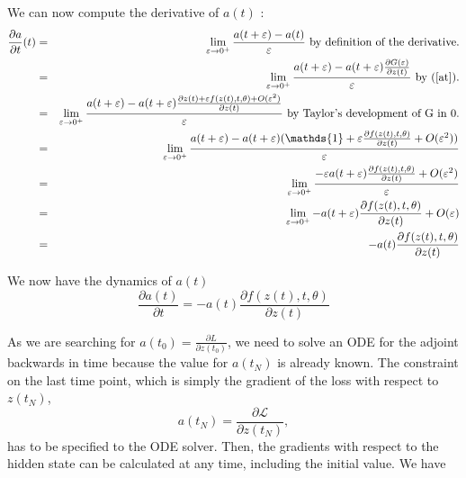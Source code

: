 \documentclass[10pt,a4paper]{article}
\theoremstyle{definition}
\theoremstyle{definition}
\theoremstyle{definition}
\begin{document}
We can now compute the derivative of $a(t)$ :
\begin{eqnarray*}
\frac{\partial a}{\partial t}(t) &=& \lim_{\varepsilon \rightarrow 0^+} \frac{a(t+\varepsilon) - a(t)}{\varepsilon} \text{ by definition of the derivative.}\\
&=& \lim_{\varepsilon \rightarrow 0^+} \frac{a(t+\varepsilon) - a(t+\varepsilon)\frac{\partial G(\varepsilon)}{\partial z(t)}}{\varepsilon} \text{ by (\ref{at}).}\\
&=& \lim_{\varepsilon \rightarrow 0^+} \frac{a(t+\varepsilon) - a(t+\varepsilon)\frac{\partial z(t) + \varepsilon f(z(t),t,\theta) + O(\varepsilon^2)}{\partial z(t)}}{\varepsilon}  \text{ by Taylor's development of G in 0.} \\
&=& \lim_{\varepsilon \rightarrow 0^+} \frac{a(t+\varepsilon) - a(t+\varepsilon)(\mathds{1} + \varepsilon \frac{\partial f(z(t),t,\theta)} {\partial z(t)}+ O(\varepsilon^2))}{\varepsilon}\\
&=& \lim_{\varepsilon \rightarrow 0^+} \frac{-\varepsilon a(t+\varepsilon) \frac{\partial f(z(t),t,\theta)} {\partial z(t)}+ O(\varepsilon^2)}{\varepsilon}\\
&=& \lim_{\varepsilon \rightarrow 0^+} - a(t+\varepsilon) \frac{\partial f(z(t),t,\theta)} {\partial z(t)}+ O(\varepsilon)\\
&=& -a(t)\frac{\partial f(z(t),t,\theta)} {\partial z(t)}
\end{eqnarray*}

We now have the dynamics of $a(t)$
\begin{equation}
\label{dynat}
\frac{\partial a(t)}{\partial t} = -a(t)\frac{\partial f(z(t),t,\theta)} {\partial z(t)}
\end{equation}
 
As we are searching for $ a(t_0) = \frac{\partial L}{\partial z(t_0)}$, we need to solve an ODE for the adjoint backwards in time because the value for $a(t_N)$ is already known. The constraint on the last time point, which is simply the gradient of the loss with respect to $z(t_N)$, 
\begin{equation*}
a(t_N) = \frac{\partial \mathcal{L}}{\partial z(t_N)},
\end{equation*}
has to be specified to the ODE solver. Then, the gradients with respect to the hidden state can be calculated at any time, including the initial value. We have 
\end{document}
